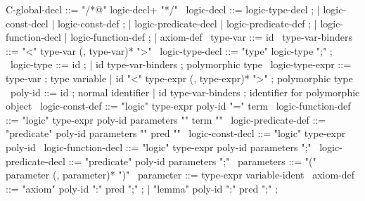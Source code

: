 \begin{syntax}
  C-global-decl ::= "/*@" logic-decl+ "*/"
  \
  logic-decl ::= logic-type-decl ;
          | logic-const-decl | logic-const-def ;
          | logic-predicate-decl | logic-predicate-def ;
          | logic-function-decl | logic-function-def ;
          | axiom-def
  \
  type-var ::= id 
  \
  type-var-binders ::= "<" type-var (, type-var)* ">" 
  \
  logic-type-decl ::= "type" logic-type ";" ;
  \
  logic-type ::= id ;
  | id type-var-binders ; polymorphic type
  \
  logic-type-expr ::= type-var ; type variable
  | id "<" type-expr (, type-expr)* ">" ; polymorphic type
  \
  poly-id ::= id ; normal identifier
  | id type-var-binders ; identifier for polymorphic object 
  \ 
  logic-const-def ::= "logic" type-expr poly-id "=" term
  \
  logic-function-def ::= "logic" type-expr poly-id parameters "{" term "}"
  \
  logic-predicate-def ::= "predicate" poly-id parameters "{" pred "}"
  \
  logic-const-decl ::= "logic" type-expr poly-id  
  \
  logic-function-decl ::= "logic" type-expr poly-id parameters ";"
  \
  logic-predicate-decl ::= "predicate" poly-id parameters ";"
  \
  parameters ::= "(" parameter (, parameter)* ")"
  \
  parameter ::= type-expr variable-ident
  \
  axiom-def ::= "axiom" poly-id ":" pred ";" ;
  | "lemma" poly-id ":" pred ";" ;
\end{syntax}